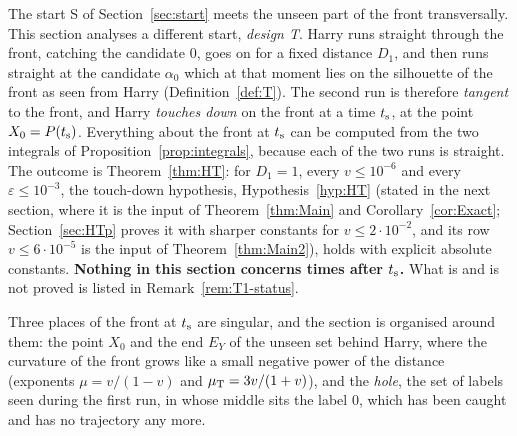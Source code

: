 The start S of Section~\ref{sec:start} meets the unseen part of the front transversally. This section analyses a different start,
\emph{design T}. Harry runs straight through the front, catching the candidate $0$, goes on for a fixed distance $D_1$, and then runs
straight at the candidate $\alpha_0$ which at that moment lies on the silhouette of the front as seen from Harry
(Definition~\ref{def:T}). The second run is therefore \emph{tangent} to the front, and Harry \emph{touches down} on the front at a time
$t_{\mathrm s}$, at the point $X_0=P(t_{\mathrm s})$. Everything about the front at $t_{\mathrm s}$ can be computed from the two integrals of
Proposition~\ref{prop:integrals}, because each of the two runs is straight. The outcome is Theorem~\ref{thm:HT}: for $D_1=1$, every
$v\le10^{-6}$ and every $\varepsilon\le10^{-3}$, the touch-down hypothesis, Hypothesis~\ref{hyp:HT} (stated in the next section,
where it is the input of Theorem~\ref{thm:Main} and Corollary~\ref{cor:Exact}; Section~\ref{sec:HTp}
proves it with sharper constants for $v\le2\cdot10^{-2}$, and its row $v\le6\cdot10^{-5}$ is the input of Theorem~\ref{thm:Main2}), holds with explicit absolute constants.
\textbf{Nothing in this section concerns times after $t_{\mathrm s}$.} What is and is not proved is listed in Remark~\ref{rem:T1-status}.

Three places of the front at $t_{\mathrm s}$ are singular, and the section is organised around them: the point $X_0$ and the end
$E_Y$ of the unseen set behind Harry, where the curvature of the front grows like a small negative power of the distance
(exponents $\mu=v/(1-v)$ and $\mu_{\mathrm T}=3v/(1+v)$), and the \emph{hole}, the set of labels seen during the first run, in whose middle sits
the label $0$, which has been caught and has no trajectory any more.

